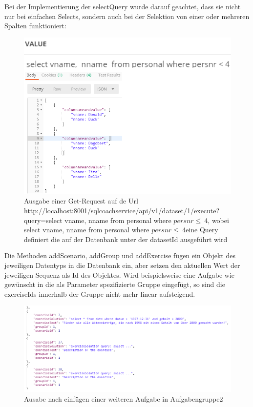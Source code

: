 \documentclass[fleqn,10pt,ngerman]{SelfArx}
\begin{document}
		Bei der Implementierung der selectQuery wurde darauf geachtet, dass sie nicht nur bei einfachen Selects, sondern auch bei der Selektion von einer oder mehreren Spalten funktioniert:
			\begin{figure}[ht]\centering
			\includegraphics[width=9 cm]{Abbildungen/select_2_spalten}
			\caption{Ausgabe einer Get-Request auf de Url http://localhost:8001/sqlcoachservice/api/v1/dataset/1/execute?query=\newline select vname,  nname  from personal where $persnr \le \ $4, wobei \dq select vname,  nname  from personal where  $persnr \le \ $4\dq eine Query definiert die auf der Datenbank unter der datasetId ausgeführt wird }
			\label{fig:fsm3}
		\end{figure}
	\newline
	Die Methoden addScenario, addGroup und addExercise fügen ein Objekt des jeweiligen Datentyps in die Datenbank ein, aber setzen den aktuellen Wert der jeweiligen Sequenz als Id des Objektes. Wird beispielsweise eine  Aufgabe wie gewünscht in die als Parameter spezifizierte Gruppe eingefügt, so sind die exerciseIds innerhalb der Gruppe nicht mehr linear aufsteigend.\newline
	\begin{figure}[ht]\centering
		\includegraphics[width=9 cm]{Abbildungen/addExercise}
		\caption{Ausabe nach einfügen einer weiteren Aufgabe in Aufgabengruppe2}
		\label{fig:addE}
	\end{figure}
\newline
\end{document}
